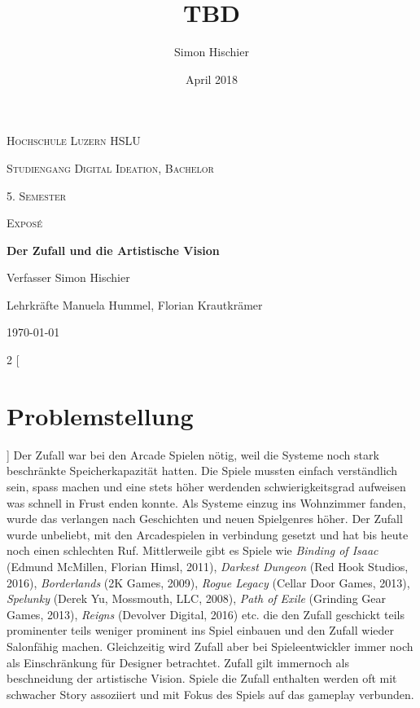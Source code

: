 \documentclass[10pt,a4paper]{article}
\title{TBD}
\author{Simon Hischier}
\date{April 2018}
\begin{document}
\begin{titlepage}
\centering
\vspace{1cm}
	{\scshape\LARGE Hochschule Luzern HSLU \par}
	\vspace{1cm}
	{\scshape\Large Studiengang Digital Ideation, Bachelor \par}
	
	{\scshape\Large 5. Semester\par}
	{\scshape\Large Exposé \par}
	\vspace{1.5cm}
	{\huge\bf Der Zufall und die Artistische Vision\par}
	
	\vspace{10cm}
	{\Large Verfasser Simon Hischier\par}
	{\Large Lehrkräfte Manuela Hummel, Florian Krautkrämer\par}
	\vfill

	{\large \today\par}
\end{titlepage}

\begin{multicols}{2}
[
\section{Problemstellung}
]
Der Zufall war bei den Arcade Spielen nötig, weil die Systeme noch stark beschränkte Speicherkapazität hatten. Die Spiele mussten einfach verständlich sein, spass machen und eine stets höher werdenden schwierigkeitsgrad aufweisen was schnell in Frust enden konnte. Als Systeme einzug ins Wohnzimmer fanden, wurde das verlangen nach Geschichten und neuen Spielgenres höher. Der Zufall wurde unbeliebt, mit den Arcadespielen in verbindung gesetzt und hat bis heute noch einen schlechten Ruf. Mittlerweile gibt es Spiele wie \textit{Binding of Isaac} (Edmund McMillen, Florian Himsl, 2011), \textit{Darkest Dungeon} (Red Hook Studios, 2016), \textit{Borderlands} (2K Games, 2009), \textit{Rogue Legacy} (Cellar Door Games, 2013), \textit{Spelunky} (Derek Yu, Mossmouth, LLC, 2008), \textit{Path of Exile} (Grinding Gear Games, 2013), \textit{Reigns} (Devolver Digital, 2016) etc. die den Zufall geschickt teils prominenter teils weniger prominent ins Spiel einbauen und den Zufall wieder Salonfähig machen. Gleichzeitig wird Zufall aber bei Spieleentwickler immer noch als Einschränkung für Designer betrachtet. Zufall gilt immernoch als beschneidung der artistische Vision. Spiele die Zufall enthalten werden oft mit schwacher Story assoziiert und mit Fokus des Spiels auf das gameplay verbunden.
\end{multicols}
\end{document}
